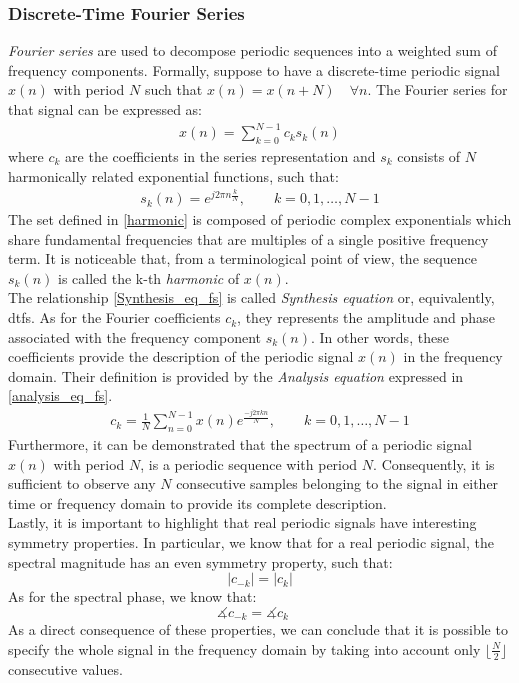 \subsubsection{Discrete-Time Fourier Series}
\textit{Fourier series} are used to decompose periodic sequences into a weighted sum of frequency components. Formally, suppose to have a discrete-time  periodic signal $x(n)$ with period $N$ such that $x(n)=x(n+N)\quad\forall n$. The Fourier series for that signal can be expressed as:
\begin{align}\label{Synthesis_eq_fs}
x(n)=\sum_{k=0}^{N-1} c_{k} s_{k}(n)
\end{align}
where {$c_k$} are the coefficients in the series representation and $s_{k}$ consists of $N$ harmonically related exponential functions, such that:
\begin{align} \label{harmonic}
s_k(n) = e^{j 2 \pi n \frac{k} {N}}, \qquad k=0,1, \ldots, N-1
\end{align}
The set defined in \ref{harmonic} is composed of periodic complex exponentials which share fundamental frequencies that are multiples of a single positive frequency term. It is noticeable that, from a terminological point of view, the sequence $s_k(n)$ is called the k-th \textit{harmonic} of $x(n)$.\\
The relationship \ref{Synthesis_eq_fs} is called \textit{Synthesis equation} or, equivalently, \gls{dtfs}. As for the Fourier coefficients $c_k$, they represents the amplitude and phase associated with the frequency component $s_k(n)$. In other words, these coefficients provide the description of the periodic signal $x(n)$ in the frequency domain. Their definition is provided by the \textit{Analysis equation} expressed in \ref{analysis_eq_fs}.
\begin{align}\label{analysis_eq_fs}
	c_{k}=\frac{1}{N} \sum_{n=0}^{N-1} x(n) e^{\frac{-j 2 \pi kn} {N}}, \qquad k=0,1, \ldots, N-1
\end{align}
\noindent Furthermore, it can be demonstrated that the spectrum of a periodic signal $x(n)$ with period $N$, is a periodic sequence with period $N$. Consequently, it is sufficient to observe any $N$ consecutive samples belonging to the signal in either time or frequency domain to provide its complete description.\\
Lastly, it is important to highlight that real periodic signals have interesting  symmetry properties. In particular, we know that for a real periodic signal, the spectral magnitude has an even symmetry property, such that: 
$$
|c_{-k}| = |c_k|
$$
As for the spectral phase, we know that:
$$
\measuredangle  c_{-k}= \measuredangle c_{k} \quad
$$
As a direct consequence of these properties, we can conclude that it is possible to specify the whole signal in the frequency domain by taking into account only $\lfloor \frac{N}{2} \rfloor$ consecutive values. 

